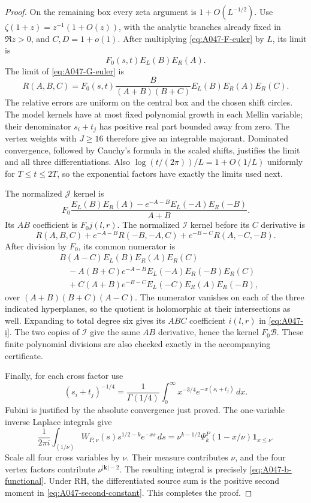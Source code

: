 \begin{proof}
On the remaining box every zeta argument is \(1+O(L^{-1/2})\).
Use
\(\zeta(1+z)=z^{-1}(1+O(z))\), with the analytic branches
already fixed in \(\Re z>0\), and \(C,D=1+o(1)\).
After multiplying \eqref{eq:A047-F-euler} by \(L\),
its limit is
\[
                  F_0(s,t)E_L(B)E_R(A).
\]
The limit of \eqref{eq:A047-G-euler} is
\[
       R(A,B,C)=
       F_0(s,t)\frac{B}{(A+B)(B+C)}
                           E_L(B)E_R(A)E_R(C).
\]
The relative errors are uniform on the central box and the
chosen shift circles.  The model kernels have at most fixed
polynomial growth in each Mellin variable; their denominator
\(s_i+t_j\) has positive real part bounded away from zero.
The vertex weights with \(J\ge16\) therefore give an
integrable majorant.  Dominated convergence, followed by
Cauchy's formula in the scaled shifts, justifies the limit
and all three differentiations.  Also
\(\log(t/(2\pi))/L=1+O(1/L)\) uniformly for
\(T\le t\le2T\), so the exponential factors have exactly
the limits used next.

The normalized \(\mathcal J\) kernel is
\[
 F_0\frac{E_L(B)E_R(A)-
                    e^{-A-B}E_L(-A)E_R(-B)}{A+B}.
\]
Its \(AB\) coefficient is \(F_0j(l,r)\).
The normalized \(\mathcal I\) kernel before its \(C\)
derivative is
\[
          R(A,B,C)+e^{-A-B}R(-B,-A,C)
                                  +e^{-B-C}R(A,-C,-B).
\]
After division by \(F_0\), its common numerator is
\begin{align*}
 &B(A-C)E_L(B)E_R(A)E_R(C)\\
 &\quad-A(B+C)e^{-A-B}E_L(-A)E_R(-B)E_R(C)\\
 &\quad+C(A+B)e^{-B-C}E_L(-C)E_R(A)E_R(-B),
\end{align*}
over \((A+B)(B+C)(A-C)\).
The numerator vanishes on each of the three indicated
hyperplanes, so the quotient is holomorphic at their
intersections as well.  Expanding to total degree six
gives its \(ABC\) coefficient \(i(l,r)\) in
\eqref{eq:A047-i}.  The two copies of \(\mathcal I\)
give the same \(AB\) derivative, hence the kernel
\(F_0\mathscr B\).  These finite polynomial divisions
are also checked exactly in the accompanying certificate.

Finally, for each cross factor use
\[
 (s_i+t_j)^{-1/4}=
       \frac1{\Gamma(1/4)}
       \int_0^\infty x^{-3/4}e^{-x(s_i+t_j)}\,dx.
\]
Fubini is justified by the absolute convergence just proved.
The one-variable inverse Laplace integrals give
\[
 \frac1{2\pi i}\int_{(1/\nu)}
     W_{P,\nu}(s)s^{1/2-k}e^{-xs}\,ds
 =\nu^{k-1/2}\Psi_k^P(1-x/\nu)\mathbf1_{x\le\nu}.
\]
Scale all four cross variables by \(\nu\).  Their measure
contributes \(\nu\), and the four vertex factors contribute
\(\nu^{|\mathbf k|-2}\).  The resulting integral is precisely
\eqref{eq:A047-b-functional}.  Under RH, the differentiated
source sum is the positive second moment in
\eqref{eq:A047-second-constant}.  This completes the proof.
\end{proof}


